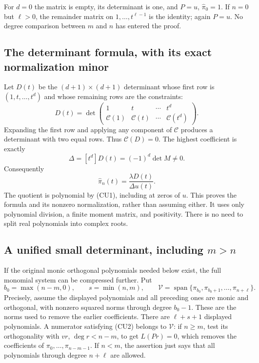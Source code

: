 \documentclass[11pt,a4paper]{article}
\theoremstyle{definition}
\begin{document}
For $d=0$ the matrix is empty, its determinant is one, and
$P=u$, $\widehat\pi_0=1$. If $n=0$ but $\ell>0$, the remainder
matrix on $1,\ldots,t^{\ell-1}$ is the identity; again $P=u$.
No degree comparison between $m$ and $n$ has entered the proof.

\subsection{The determinant formula, with its exact normalization minor}

Let $D(t)$ be the $(d+1)\times(d+1)$ determinant whose first row is
$(1,t,\ldots,t^d)$ and whose remaining rows are the constraints:
\[
 D(t)=\det\begin{pmatrix}
 1&t&\cdots&t^d\\
 \mathcal C(1)&\mathcal C(t)&\cdots&\mathcal C(t^d)
 \end{pmatrix}.
 \tag{CU4}
\]
Expanding the first row and applying any component of $\mathcal C$
produces a determinant with two equal rows. Thus $\mathcal C(D)=0$.
The highest coefficient is exactly
\[
 \Delta=[t^d]D(t)=(-1)^d\det M\ne0.
\]
Consequently
\[
 \boxed{\quad
 \widehat\pi_n(t)=\frac{\lambda D(t)}{\Delta u(t)}.
 \quad}
 \tag{CU5}
\]
The quotient is polynomial by (CU1), including at zeros of $u$.
This proves the formula and its nonzero normalization, rather than
assuming either. It uses only polynomial division, a finite moment
matrix, and positivity. There is no need to split real polynomials
into complex roots.

\subsection{A unified small determinant, including $m>n$}

If the original monic orthogonal polynomials needed below exist,
the full monomial system can be compressed further. Put
\[
 b_0=\max(n-m,0),\qquad s=\min(n,m),\qquad
 \mathcal V=\operatorname{span}
 \{\pi_{b_0},\pi_{b_0+1},\ldots,\pi_{n+\ell}\}.
 \tag{CU6}
\]
Precisely, assume the displayed polynomials and all preceding ones
are monic and orthogonal, with nonzero squared norms through degree
$b_0-1$. These are the norms used to remove the earlier coefficients.
There are $\ell+s+1$ displayed polynomials. A numerator satisfying
(CU2) belongs to $\mathcal V$: if $n\ge m$, test its orthogonality
with $v r$, $\deg r<n-m$, to get $L(Pr)=0$, which removes the
coefficients of $\pi_0,\ldots,\pi_{n-m-1}$. If $n<m$, the assertion
just says that all polynomials through degree $n+\ell$ are allowed.
\end{document}
